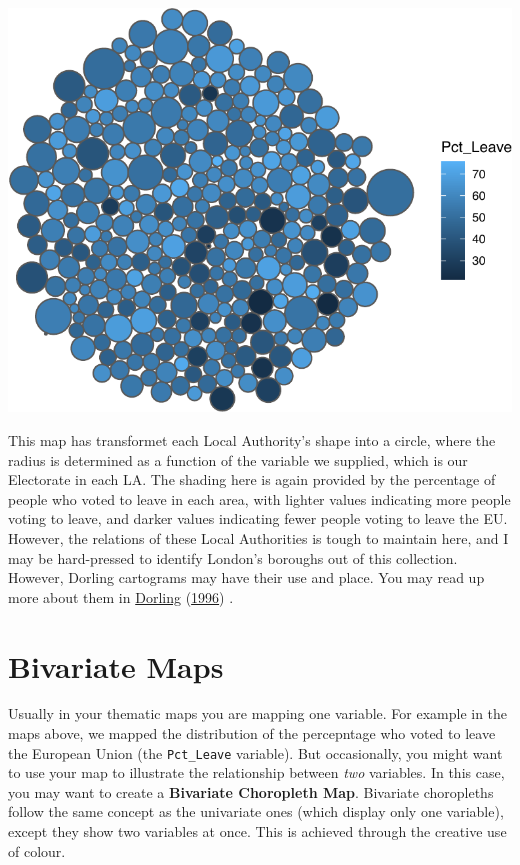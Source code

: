 \documentclass[
]{book}
\begin{document}
\includegraphics{crime_mapping_files/figure-latex/unnamed-chunk-139-1.pdf}

This map has transformet each Local Authority's shape into a circle, where the radius is determined as a function of the variable we supplied, which is our Electorate in each LA. The shading here is again provided by the percentage of people who voted to leave in each area, with lighter values indicating more people voting to leave, and darker values indicating fewer people voting to leave the EU. However, the relations of these Local Authorities is tough to maintain here, and I may be hard-pressed to identify London's boroughs out of this collection. However, Dorling cartograms may have their use and place. You may read up more about them in \protect\hyperlink{ref-Dorling_1996}{Dorling} (\protect\hyperlink{ref-Dorling_1996}{1996}) .

\hypertarget{bivariate-maps}{%
\section{Bivariate Maps}\label{bivariate-maps}}

Usually in your thematic maps you are mapping one variable. For example in the maps above, we mapped the distribution of the percepntage who voted to leave the European Union (the \texttt{Pct\_Leave} variable). But occasionally, you might want to use your map to illustrate the relationship between \emph{two} variables. In this case, you may want to create a \textbf{Bivariate Choropleth Map}. Bivariate choropleths follow the same concept as the univariate ones (which display only one variable), except they show two variables at once. This is achieved through the creative use of colour.
\end{document}
